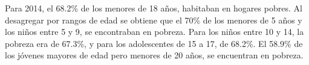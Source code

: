 Para 2014, el 68.2\% de los menores de 18 años, habitaban en hogares pobres. Al  desagregar por rangos de edad se obtiene que el 70\% de los menores de 5 años y los niños entre 5 y 9, se encontraban en pobreza. Para los niños entre 10 y 14, la pobreza era de 67.3\%, y para los adolescentes de 15 a 17, de 68.2\%. El 58.9\% de los jóvenes mayores de edad pero menores de 20 años, se encuentran en pobreza.    